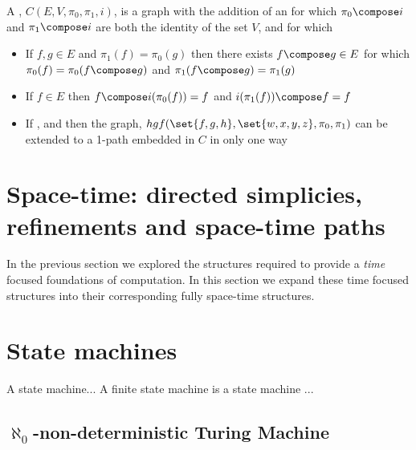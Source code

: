 \documentclass[a4paper]{amsart}
\begin{document}
\begin{definition}

A , $C(E, V, \pi_0, \pi_1, i)$, is a graph with the addition of an 
  for which $\pi_0 \compose i$ and $\pi_1 
\compose i$ are both the identity of the set $V$, and for which 

\begin{itemize}

\item If $f, g \in E$ and $\pi_1(f) = \pi_0(g)$ then there exists $f \compose g \in E$ for 
which $ \pi_0(f) = \pi_0(f \compose g)$ and $ \pi_1(f \compose g) = \pi_1(g)$

\item If $f \in E$ then $ f \compose i(\pi_0(f)) = f$ and $i(\pi_1(f)) \compose f = f$

\item If ,  and  then the graph, $hgf(\set{f,
g, h}, \set{w, x, y, z}, \pi_0, \pi_1)$ can be extended to a 1-path embedded in $C$ in only 
one way

\end{itemize}

\end{definition}

\section{Space-time: directed simplicies, refinements and space-time paths}

In the previous section we explored the structures required to provide a \emph{time} focused 
foundations of computation. In this section we expand these time focused structures into 
their corresponding fully space-time structures.

\section{State machines}

\begin{definition}

A state machine... A finite state machine is a state machine ...

\end{definition}

\subsection{$\aleph_0$-non-deterministic Turing Machine}
\end{document}
